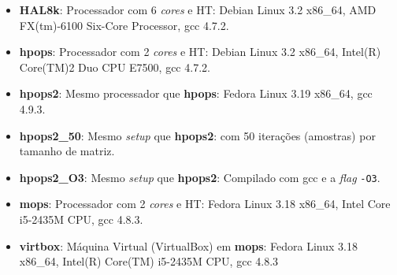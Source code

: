 \begin{itemize}
\item \textbf{HAL8k}: 
Processador com 6 \textit{cores} e HT: Debian Linux 3.2 x86\_64, AMD 
FX(tm)-6100 Six-Core Processor, gcc 4.7.2.
\item \textbf{hpops}: 
Processador com 2 \textit{cores} e HT: Debian Linux 3.2 x86\_64, 
Intel(R) Core(TM)2 Duo CPU E7500, gcc 4.7.2.
\item \textbf{hpops2}: 
Mesmo processador que \textbf{hpops}: Fedora 
Linux 3.19 x86\_64, gcc 4.9.3.
\item \textbf{hpops2\_50}: 
Mesmo \textit{setup} que \textbf{hpops2}: com 50 iterações (amostras) por 
tamanho de matriz.
\item \textbf{hpops2\_O3}: 
Mesmo \textit{setup} que \textbf{hpops2}: Compilado 
com gcc e a \textit{flag} \texttt{-O3}.
\item \textbf{mops}: 
Processador com 2 \textit{cores} e HT: Fedora Linux 3.18 x86\_64, 
Intel Core i5-2435M CPU, gcc 4.8.3.
\item \textbf{virtbox}: 
Máquina Virtual (VirtualBox) em \textbf{mops}:
Fedora Linux 3.18 x86\_64, Intel(R) Core(TM) i5-2435M CPU, gcc 4.8.3
\end{itemize}
